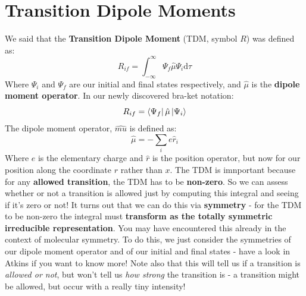 \documentclass{memoir}[11pt,oneside,a4paper,openany]
\newcommand{\dd}{\ensuremath{\mathrm{d}}}
\begin{document}
\chapter{Transition Dipole Moments}\label{app:TDM}
We said that the \textbf{Transition Dipole Moment} (TDM, symbol $R$) was defined as:
\begin{equation}
	R_{if} = \int_{-\infty}^{\infty} \Psi_f \hat{\mu} \Psi_i \dd \tau
\end{equation}
Where $\Psi_i$ and $\Psi_f$ are our initial and final states respectively, and $\hat{\mu}$ is the \textbf{dipole moment operator}. In our newly discovered bra-ket notation:
\begin{equation}
	R_{if} = \bra{\Psi_f}\hat{\mu}\ket{\Psi_i}
\end{equation}
The dipole moment operator, $\hat{mu}$ is defined as:
\begin{equation}
	\hat{\mu} = -\sum_i e\hat{r}_i
\end{equation}
Where $e$ is the elementary charge and $\hat{r}$ is the position operator, but now for our position along the coordinate $r$ rather than $x$. The TDM is imnportant because for any \textbf{allowed transition}, the TDM has to be \textbf{non-zero}. So we can assess whether or not a transition is allowed just by computing this integral and seeing if it's zero or not! It turns out that we can do this via \textbf{symmetry} - for the TDM to be non-zero the integral must \textbf{transform as the totally symmetric irreducible representation}. You may have encountered this already in the context of molecular symmetry. To do this, we just consider the symmetries of our dipole moment operator and of our initial and final states - have a look in Atkins if you want to know more! Note also that this will tell us if a transition is \emph{allowed or not}, but won't tell us \emph{how strong} the transition is - a transition might be allowed, but occur with a really tiny intensity!
\end{document}
